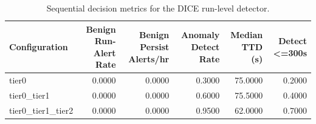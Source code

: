 \begin{table}[t]
\centering
\caption{Sequential decision metrics for the DICE run-level detector.}
\label{tab:dice_sequential_metrics}
\footnotesize
\begin{tabular}{lrrrrr}
\toprule
Configuration & Benign Run-Alert Rate & Benign Persist Alerts/hr & Anomaly Detect Rate & Median TTD (s) & Detect <=300s \\
\midrule
tier0 & 0.0000 & 0.0000 & 0.3000 & 75.0000 & 0.2000 \\
tier0_tier1 & 0.0000 & 0.0000 & 0.6000 & 75.5000 & 0.4000 \\
tier0_tier1_tier2 & 0.0000 & 0.0000 & 0.9500 & 62.0000 & 0.7000 \\
\bottomrule
\end{tabular}

\end{table}
